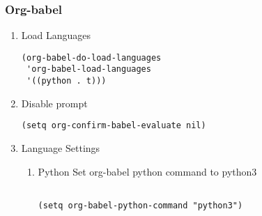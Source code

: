 \documentclass[11pt]{article}
\begin{document}
\subsubsection{Org-babel}
\label{sec:org789ed60}
\begin{enumerate}
\item Load Languages
\label{sec:org75a66ad}
\begin{verbatim}
(org-babel-do-load-languages
 'org-babel-load-languages
 '((python . t)))
\end{verbatim}
\item Disable prompt
\label{sec:orga670970}
\begin{verbatim}
(setq org-confirm-babel-evaluate nil) 
\end{verbatim}
\item Language Settings
\label{sec:orgb53a5d3}
\begin{enumerate}
\item Python
\label{sec:orgeb90653}
Set org-babel python command to python3
\begin{verbatim}

(setq org-babel-python-command "python3")

\end{verbatim}
\end{enumerate}
\end{enumerate}
\end{document}
